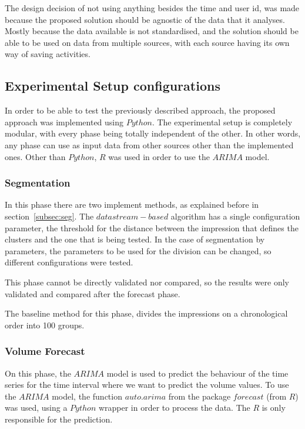 The design decision of not using anything besides the time and user id, was made
because the proposed solution should be agnostic of the data that it analyses.
Mostly because the data available is not standardised, and the solution should be
able to be used on data from multiple sources, with each source having its own
way of saving activities.

\subsection{Experimental Setup configurations}

In order to be able to test the previously described approach, the proposed
approach was implemented using $Python$. The experimental setup is completely
modular, with every phase being totally independent of the other. In other
words, any phase can use as input data from other sources other than the implemented
ones. Other than $Python$, $R$ was used in order to use the $ARIMA$ model.

\subsubsection*{Segmentation}

In this phase there are two implement methods, as explained
before in section~\ref{subsec:seg}. The $data stream-based$ algorithm has a
single configuration parameter, the threshold for the distance between the
impression that defines the clusters and the one that is being tested.
In the case of segmentation by parameters, the parameters to be used for
the division can be changed, so different configurations were tested.

This phase cannot be directly validated nor compared, so the results were
only validated and compared after the forecast phase.

The baseline method for this phase, divides the impressions on a chronological
order into 100 groups.

\subsubsection*{Volume Forecast}

On this phase, the $ARIMA$ model is used to predict the behaviour of the time
series for the time interval where we want to predict the volume values. To use
the $ARIMA$ model, the function $auto.arima$ from the package $forecast$
\cite{hyndman2007automatic} (from $R$)
was used, using a $Python$ wrapper in order to process the data. The $R$ is only
responsible for the prediction.

